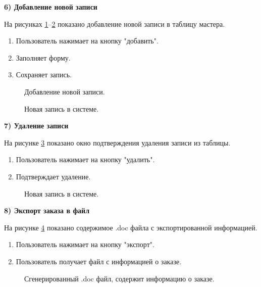 \textbf{6) Добавление новой записи}

На рисунках \ref{stored:addone}--\ref{stored:addone1} показано добавление новой записи в таблицу мастера.
\begin{enumerate}
	\item Пользователь нажимает на кнопку "добавить".
	\item Заполняет форму.
	\item Сохраняет запись.
\end{enumerate}

\begin{figure}[ht]
	\caption{Добавление новой записи.}
	\label{stored:addone}
\end{figure}

\begin{figure}[ht]
	\caption{Новая запись в системе.}
	\label{stored:addone1}
\end{figure}

\textbf{7) Удаление записи}

На рисунке \ref{stored:delete} показано окно подтверждения удаления записи из таблицы.
\begin{enumerate}
	\item Пользователь нажимает на кнопку "удалить".
	\item Подтверждает удаление.
\end{enumerate}

\begin{figure}[ht]
	\caption{Новая запись в системе.}
	\label{stored:delete}
\end{figure}
\newpage

\textbf{8) Экспорт заказа в файл}

На рисунке \ref{stored:docdoc} показано содержимое .doc файла с экспортированной информацией.
\begin{enumerate}
	\item Пользователь нажимает на кнопку "экспорт".
	\item Пользователь получает файл с информацией о заказе.
\end{enumerate}

\begin{figure}[ht]
	\caption{Сгенерированный .doc файл, содержит информацию о заказе.}
	\label{stored:docdoc}
\end{figure}

